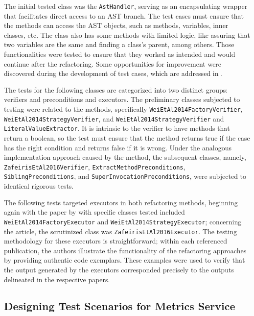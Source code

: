 The initial tested class was the \texttt{AstHandler}, serving as an encapsulating wrapper that facilitates direct access to an AST branch. The test cases must ensure that the methods can access the AST objects, such as methods, variables, inner classes, etc. The class also has some methods with limited logic, like assuring that two variables are the same and finding a class's parent, among others. Those functionalities were tested to ensure that they worked as intended and would continue after the refactoring. Some opportunities for improvement were discovered during the development of test cases, which are addressed in . 

The tests for the following classes are categorized into two distinct groups: verifiers and preconditions and executors. The preliminary classes subjected to testing were related to the \textcite{Liu2014} methods, specifically \texttt{WeiEtAl2014FactoryVerifier}, \texttt{WeiEtAl2014StrategyVerifier}, and 	\texttt{WeiEtAl2014StrategyVerifier} and \texttt{LiteralValueExtractor}. It is intrinsic to the verifier to have methods that return a boolean, so the test must ensure that the method returns true if the case has the right condition and returns false if it is wrong. Under the analogous implementation approach caused by the \textcite{zafeiris2017automated} method, the subsequent classes, namely, \texttt{ZafeirisEtAl2016Verifier}, \texttt{ExtractMethodPreconditions}, \texttt{SiblingPreconditions}, and \texttt{SuperInvocationPreconditions}, were subjected to identical rigorous tests.

The following tests targeted executors in both refactoring methods, beginning again with the paper by \textcite{Liu2014} with specific classes tested included \texttt{WeiEtAl2014FactoryExecutor} and \texttt{WeiEtAl2014StrategyExecutor}; concerning the 	\textcite{zafeiris2017automated} article, the scrutinized class was \texttt{ZafeirisEtAl2016Executor}. The testing methodology for these executors is straightforward; within each referenced publication, the authors illustrate the functionality of the refactoring approaches by providing authentic code exemplars. These examples were used to verify that the output generated by the executors corresponded precisely to the outputs delineated in the respective papers.

\subsection{Designing Test Scenarios for Metrics Service}
\label{metrics-design-tests}

